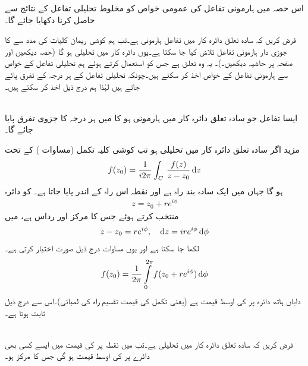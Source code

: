 اس حصہ میں ہارمونی تفاعل کی عمومی خواص کو مخلوط تحلیلی تفاعل کے نتائج سے حاصل کرنا دکھایا جائے گا۔

فرض کریں کہ سادہ تعلق دائرہ کار  میں تفاعل  ہارمونی ہے۔تب ہم کوشی ریمان کلیات کی مدد سے  کا جوڑی دار ہارمونی تفاعل  تلاش کیا جا سکتا ہے۔یوں   دائرہ کار  میں تحلیلی ہو گا (حصہ  دیکھیں اور  صفحہ  پر حاشیہ دیکھیں۔)۔ یہ وہ تعلق ہے جس کو استعمال کرتے ہوئے ہم تحلیلی تفاعل کے خواص سے ہارمونی تفاعل کے خواص اخذ کر سکتے ہیں۔چونکہ تحلیلی تفاعل کے ہر درجہ کے تفرق پائے جاتے ہیں لہٰذا ہم درج ذیل اخذ کر سکتے ہیں۔

\quad {}\\
 ایسا تفاعل  جو سادہ تعلق دائرہ کار  میں ہارمونی ہو کا   میں ہر درجہ کا جزوی تفرق پایا جائے گا۔  

مزید اگر سادہ تعلق دائرہ کار  میں  تحلیلی ہو تب کوشی کلیہ تکمل (مساوات ) کے تحت
\begin{align}\label{مساوات_مخلوط_مخفی_خواص_الف}
f(z_0)=\frac{1}{i2\pi}\int_C\,\frac{f(z)}{z-z_0}\dif z
\end{align}
ہو گا جہاں   میں  ایک سادہ بند راہ ہے اور نقطہ  اس راہ کے اندر پایا جاتا ہے۔ کو دائرہ
\begin{align*}
z=z_0+re^{i\phi}
\end{align*} 
 منتخب کرتے ہوئے جس کا مرکز  اور رداس  ہے،   میں 
\begin{align*}
z-z_0=re^{i\phi},\quad \dif z=ire^{i\phi}\dif \phi
\end{align*}
لکھا جا سکتا ہے اور یوں مساوات   درج ذیل صورت اختیار کرتی ہے۔
\begin{align}\label{مساوات_مخفی_قوہ_کوشی_تکمل_کلیہ_رداس_زاویہ_الف}
f(z_0)=\frac{1}{2\pi}\int\limits_0^{2\pi} f(z_0+re^{i\phi})\dif \phi
\end{align}
دایاں ہاتھ دائرہ  پر  کی اوسط قیمت ہے (یعنی تکمل کی قیمت تقسیم راہ کی لمبائی)۔اس سے درج ذیل ثابت ہوتا ہے۔

\quad {}\\
فرض کریں کہ سادہ تعلق دائرہ کار  میں  تحلیلی ہے۔تب  میں نقطہ  پر  کی قیمت  میں ایسے کسی بھی دائرے پر  کی اوسط قیمت ہو گی جس کا مرکز  ہو۔ 

